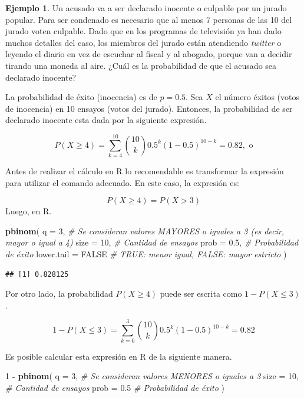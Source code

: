 \documentclass[
  11pt,
]{book}
\newenvironment{Shaded}{\begin{snugshade}}{\end{snugshade}}
\newcommand{\AttributeTok}[1]{\textcolor[rgb]{0.13,0.29,0.53}{#1}}
\newcommand{\CommentTok}[1]{\textcolor[rgb]{0.56,0.35,0.01}{\textit{#1}}}
\newcommand{\ConstantTok}[1]{\textcolor[rgb]{0.56,0.35,0.01}{#1}}
\newcommand{\DecValTok}[1]{\textcolor[rgb]{0.00,0.00,0.81}{#1}}
\newcommand{\FloatTok}[1]{\textcolor[rgb]{0.00,0.00,0.81}{#1}}
\newcommand{\FunctionTok}[1]{\textcolor[rgb]{0.13,0.29,0.53}{\textbf{#1}}}
\newcommand{\NormalTok}[1]{#1}
\newcommand{\SpecialCharTok}[1]{\textcolor[rgb]{0.81,0.36,0.00}{\textbf{#1}}}
\theoremstyle{definition}
\theoremstyle{definition}
\newtheorem{example}{Ejemplo}[chapter]
\theoremstyle{definition}
\theoremstyle{definition}
\theoremstyle{remark}
\begin{document}
\begin{example}
Un acusado va a ser declarado inocente o culpable por un jurado popular. Para ser condenado es necesario que al menos 7 personas de las 10 del jurado voten culpable. Dado que en los programas de televisión ya han dado muchos detalles del caso, los miembros del jurado están atendiendo \textit{twitter} o leyendo el diario en vez de escuchar al fiscal y al abogado, porque van a decidir tirando una moneda al aire. ¿Cuál es la probabilidad de que el acusado sea declarado inocente?

La probabilidad de éxito (inocencia) es de \(p = 0.5\). Sea \(X\) el número éxitos (votos de inocencia) en 10 ensayos (votos del jurado). Entonces, la probabilidad de ser declarado inocente esta dada por la siguiente expresión.

\[
P(X \geq 4) = \sum_{k=4}^{10} \binom{10}{k} 0.5^{k}(1-0.5)^{10-k} = 0.82,\text{ o}
\]

Antes de realizar el cálculo en R lo recomendable es transformar la expresión para utilizar el comando adecuado. En este caso, la expresión es:

\[P(X\geq 4) = P(X > 3)\]
Luego, en R.

\begin{Shaded}
\begin{Highlighting}[]
\FunctionTok{pbinom}\NormalTok{(}
  \AttributeTok{q =} \DecValTok{3}\NormalTok{, }\CommentTok{\# Se consideran valores MAYORES o iguales a 3 (es decir, mayor o igual a 4)}
  \AttributeTok{size =} \DecValTok{10}\NormalTok{, }\CommentTok{\# Cantidad de ensayos}
  \AttributeTok{prob =} \FloatTok{0.5}\NormalTok{, }\CommentTok{\# Probabilidad de éxito}
  \AttributeTok{lower.tail =} \ConstantTok{FALSE} \CommentTok{\# TRUE: menor igual, FALSE: mayor estricto}
\NormalTok{)}
\end{Highlighting}
\end{Shaded}

\begin{verbatim}
## [1] 0.828125
\end{verbatim}

Por otro lado, la probabilidad \(P(X\geq 4)\) puede ser escrita como \(1 - P(X \leq 3)\).

\[
1 - P(X \leq 3) = \sum_{k=0}^{3} \binom{10}{k} 0.5^{k}(1-0.5)^{10-k} = 0.82
\]

Es posible calcular esta expresión en R de la siguiente manera.

\begin{Shaded}
\begin{Highlighting}[]
\DecValTok{1} \SpecialCharTok{{-}} \FunctionTok{pbinom}\NormalTok{(}
  \AttributeTok{q =} \DecValTok{3}\NormalTok{, }\CommentTok{\# Se consideran valores MENORES o iguales a 3}
  \AttributeTok{size =} \DecValTok{10}\NormalTok{, }\CommentTok{\# Cantidad de ensayos}
  \AttributeTok{prob =} \FloatTok{0.5} \CommentTok{\# Probabilidad de éxito}
\NormalTok{)}
\end{Highlighting}
\end{Shaded}


\end{example}
\end{document}
